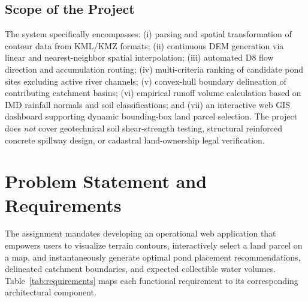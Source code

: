 \documentclass[manuscript,screen,review]{acmart}
\begin{document}
\subsection{Scope of the Project}
The system specifically encompasses: (i) parsing and spatial transformation of contour data from KML/KMZ formats; (ii) continuous DEM generation via linear and nearest-neighbor spatial interpolation; (iii) automated D8 flow direction and accumulation routing; (iv) multi-criteria ranking of candidate pond sites excluding active river channels; (v) convex-hull boundary delineation of contributing catchment basins; (vi) empirical runoff volume calculation based on IMD rainfall normals and soil classifications; and (vii) an interactive web GIS dashboard supporting dynamic bounding-box land parcel selection. The project does \emph{not} cover geotechnical soil shear-strength testing, structural reinforced concrete spillway design, or cadastral land-ownership legal verification.

\section{Problem Statement and Requirements}
\label{sec:requirements}
The assignment mandates developing an operational web application that empowers users to visualize terrain contours, interactively select a land parcel on a map, and instantaneously generate optimal pond placement recommendations, delineated catchment boundaries, and expected collectible water volumes. Table~\ref{tab:requirements} maps each functional requirement to its corresponding architectural component.
\end{document}

